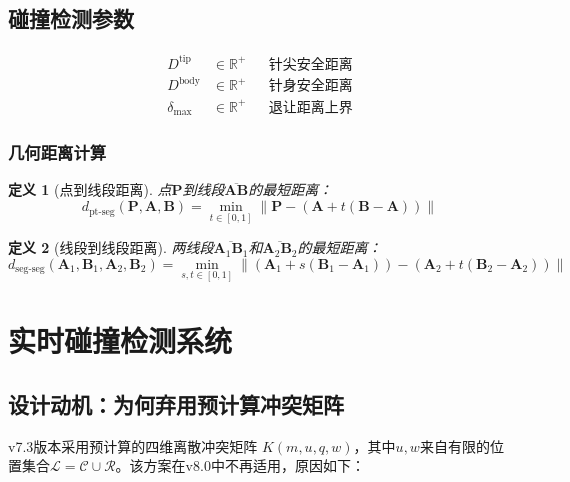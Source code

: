 \documentclass[11pt,a4paper]{article}
\newtheorem{definition}{定义}[section]
\begin{document}
\subsection{碰撞检测参数}

\begin{align}
    D^{\text{tip}} &\in \mathbb{R}^+ && \text{针尖安全距离} \\
    D^{\text{body}} &\in \mathbb{R}^+ && \text{针身安全距离} \\
    \delta_{\max} &\in \mathbb{R}^+ && \text{退让距离上界}
\end{align}

\subsubsection{几何距离计算}

\begin{definition}[点到线段距离]
点$\mathbf{P}$到线段$\overline{\mathbf{AB}}$的最短距离：
\begin{equation}
    d_{\text{pt-seg}}(\mathbf{P}, \mathbf{A}, \mathbf{B}) = \min_{t \in [0,1]} \|\mathbf{P} - (\mathbf{A} + t(\mathbf{B} - \mathbf{A}))\|
\end{equation}
\end{definition}

\begin{definition}[线段到线段距离]
两线段$\overline{\mathbf{A}_1\mathbf{B}_1}$和$\overline{\mathbf{A}_2\mathbf{B}_2}$的最短距离：
\begin{equation}
    d_{\text{seg-seg}}(\mathbf{A}_1, \mathbf{B}_1, \mathbf{A}_2, \mathbf{B}_2) = \min_{s,t \in [0,1]} \|(\mathbf{A}_1 + s(\mathbf{B}_1 - \mathbf{A}_1)) - (\mathbf{A}_2 + t(\mathbf{B}_2 - \mathbf{A}_2))\|
\end{equation}
\end{definition}

\section{实时碰撞检测系统} \label{sec:collision}

\subsection{设计动机：为何弃用预计算冲突矩阵}

v7.3版本采用预计算的四维离散冲突矩阵 $K(m,u,q,w)$，其中$u, w$来自有限的位置集合$\mathcal{L} = \mathcal{C} \cup \mathcal{R}$。该方案在v8.0中不再适用，原因如下：
\end{document}
